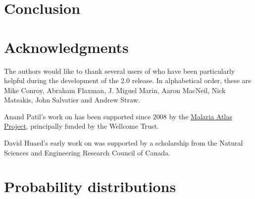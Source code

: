 \documentclass[]{jss_mod}
\begin{document}
\section{Conclusion}
\label{conclusion}


\section[Acknowledgments]{Acknowledgments}
\label{chap:acknowledge}
The authors would like to thank several users of  who have been particularly helpful during the development of the 2.0 release. In alphabetical order, these are Mike Conroy, Abraham Flaxman, J. Miguel Marin, Aaron MacNeil, Nick Matsakis, John Salvatier and Andrew Straw.

Anand Patil's work on  has been supported since 2008 by the \href{http://www.map.ox.ac.uk}{Malaria Atlas Project}, principally funded by the Wellcome Trust.

David Huard's early work on  was supported by a scholarship from the Natural Sciences and Engineering Research Council of Canada. 
\newpage
\appendix
% 

\section[Distributions]{Probability distributions}
\label{chap:distributions}

\newpage

\nocite{Bernardo:1992fk}
\nocite{r} 
\nocite{jags} 
\nocite{winbugs}
\nocite{hbc} 

\end{document}
